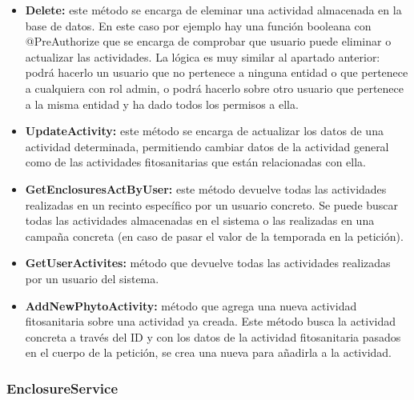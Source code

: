 \begin{itemize}
\begin{itemize}
        \item La fecha de la campaña es correcta si el año de la campaña no es inferior al año actual, puesto que no se pueden crear actividades para campañas pasadas o cerradas.
    \end{itemize}

    Estas funciones que se utilizan con la anotación @PreAuthorize han sido usadas en muchos otros métodos para controlar quien puede ejecutar cada lógica de negocio, de acuerdo a roles y relaciones
    con las entidades.

    \item \textbf{Delete:} este método se encarga de eleminar una actividad almacenada en la base de datos. En este caso por ejemplo hay una función booleana con @PreAuthorize que se encarga de 
    comprobar que usuario puede eliminar o actualizar las actividades. La lógica es muy similar al apartado anterior: podrá hacerlo un usuario que no pertenece a ninguna entidad o que pertenece a cualquiera 
    con rol admin, o podrá hacerlo sobre otro usuario que pertenece a la misma entidad y ha dado todos los permisos a ella.

    \item \textbf{UpdateActivity:} este método se encarga de actualizar los datos de una actividad determinada, permitiendo cambiar datos de la actividad general como de las actividades fitosanitarias que 
    están relacionadas con ella.

    \item \textbf{GetEnclosuresActByUser:} este método devuelve todas las actividades realizadas en un recinto específico por un usuario concreto. Se puede buscar todas las actividades almacenadas en el sistema o las
    realizadas en una campaña concreta (en caso de pasar el valor de la temporada en la petición).

    \item \textbf{GetUserActivites:} método que devuelve todas las actividades realizadas por un usuario del sistema.
    
    \item \textbf{AddNewPhytoActivity:} método que agrega una nueva actividad fitosanitaria sobre una actividad ya creada. Este método busca la actividad concreta a través del ID y con los datos de la actividad
    fitosanitaria pasados en el cuerpo de la petición, se crea una nueva para añadirla a la actividad.
\end{itemize}

\subsubsection{EnclosureService}


